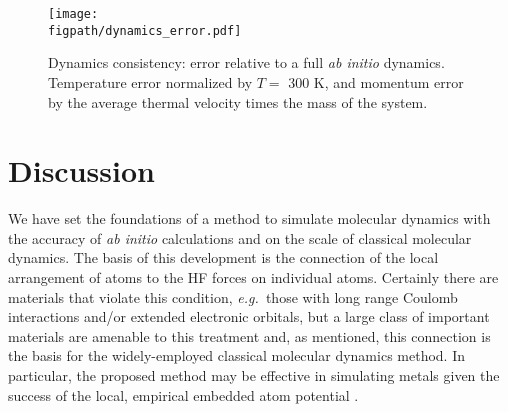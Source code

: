 \documentclass[journal=jctcce,manuscript=article]{achemso}
\newlength{\figwidth}
\newcommand{\figpath}{Figures}
\newcommand{\eg}{{\it e.g.\ }}
\newcommand{\abinitio}{{\it ab initio }}
\begin{document}
\begin{figure}[h]
{\texttt{[image: \\figpath/dynamics\_error.pdf]}}
\caption{ Dynamics consistency: error relative to a full \abinitio dynamics. 
Temperature error normalized by $T=$ 300 K, and momentum error by the average thermal velocity times the mass of the system.
}
\label{fig:dynamics_consistency}
\end{figure}

\section{Discussion} \label{sec:discussion}

We have set the foundations of a method to simulate molecular dynamics with the accuracy of \abinitio calculations and on the scale of classical molecular dynamics.
The basis of this development is the connection of the local arrangement of atoms to the HF forces on individual atoms. 
Certainly there are materials that violate this condition, \eg those with long range Coulomb interactions and/or extended electronic orbitals, but a large class of important materials are amenable to this treatment and, as mentioned, this connection is the basis for the widely-employed classical molecular dynamics method.
In particular, the proposed method may be effective in simulating metals given the success of the local, empirical embedded atom potential \cite{daw1984embedded}.
\end{document}
